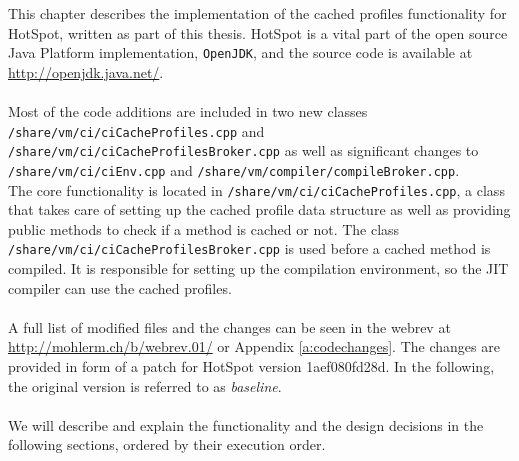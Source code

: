 This chapter describes the implementation of the cached profiles functionality for HotSpot, written as part of this thesis.
HotSpot is a vital part of the open source Java Platform implementation, \texttt{OpenJDK}, and the source code is available at \url{http://openjdk.java.net/}.
\\\\
Most of the code additions are included in two new classes \texttt{/share/vm/ci/ciCacheProfiles.cpp} and \texttt{/share/vm/ci/ciCacheProfilesBroker.cpp} as well as significant changes to \\\texttt{/share/vm/ci/ciEnv.cpp} and \texttt{/share/vm/compiler/compileBroker.cpp}.
\\
The core functionality is located in \texttt{/share/vm/ci/ciCacheProfiles.cpp}, a class that takes care of setting up the cached profile data structure as well as providing public methods to check if a method is cached or not. The class \texttt{/share/vm/ci/ciCacheProfilesBroker.cpp} is used before a cached method is compiled. It is responsible for setting up the compilation environment, so the JIT compiler can use the cached profiles.
\\\\
A full list of modified files and the changes can be seen in the webrev at \url{http://mohlerm.ch/b/webrev.01/} or Appendix \ref{a:codechanges}.
The changes are provided in form of a patch for HotSpot version 1aef080fd28d. In the following, the original version is referred to as \textit{baseline}.
\\\\
We will describe and explain the functionality and the design decisions in the following sections, ordered by their execution order.

